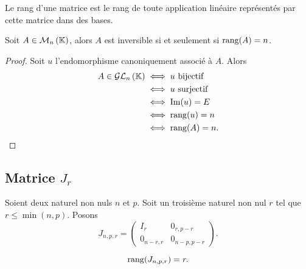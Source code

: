 \begin{corth}
  Le rang d'une matrice est le rang de toute application linéaire représentés par cette matrice dans des bases.
\end{corth}

\begin{corth}
  Soit $A \in \mathcal{M}_{n}\left(\mathbb{K}\right)$, alors $A$ est inversible si et seulement si $\operatorname{rang}(A)=n$.
\end{corth}
\begin{proof}
  Soit $u$ l'endomorphisme canoniquement associé à $A$. Alors
  \begin{align}
    A \in \mathcal{GL}_{n}\left(\mathbb{K}\right) &\iff u \text{~bijectif}\\
    &\iff u \text{~surjectif}\\
    &\iff \operatorname{Im}(u)=E\\
    &\iff \operatorname{rang}(u) = n\\
    &\iff \operatorname{rang}(A) = n.
  \end{align}
\end{proof}

\subsection{Matrice $J_r$}

Soient deux naturel non nuls $n$ et $p$. Soit un troisième naturel non nul $r$ tel que $r \leqslant \min(n,p)$. Posons
\begin{equation}
  J_{n,p,r}=
  \begin{pmatrix}
    I_r & 0_{r,p-r} \\ 0_{n-r,r} & 0_{n-p,p-r}
  \end{pmatrix}.
\end{equation}

\begin{prop}
  \begin{equation}
    \operatorname{rang}(J_{n,p,r})=r.
  \end{equation}
\end{prop}

